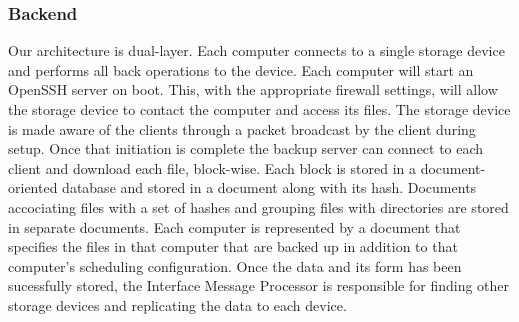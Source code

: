 \subsubsection{Backend}

Our architecture is dual-layer. Each computer connects to a single storage
device and performs all back operations to the device. Each computer will start
an OpenSSH server on boot. This, with the appropriate firewall settings, will
allow the storage device to contact the computer and access its files. The
storage device is made aware of the clients through a packet broadcast by the
client during setup. Once that initiation is complete the backup server can
connect to each client and download each file, block-wise. Each block is stored
in a document-oriented database and stored in a document along with its hash.
Documents accociating files with a set of hashes and grouping files with
directories are stored in separate documents. Each computer is represented by a
document that specifies the files in that computer that are backed up in
addition to that computer's scheduling configuration. Once the data and its form
has been sucessfully stored, the Interface Message Processor is responsible for
finding other storage devices and replicating the data to each device.
